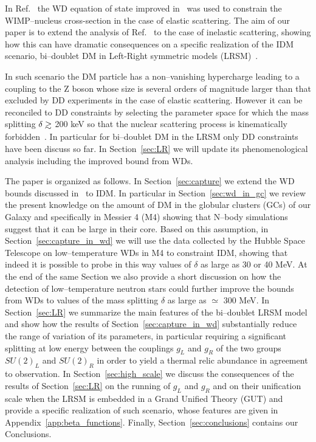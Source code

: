 \documentclass[11pt]{article}
\newcommand{\gsim}{\mathrel{\mathop{\kern 0pt
      \rlap{\raise.2ex\hbox{$>$}}}\lower.9ex\hbox{\kern-.190em $\sim$}}}
\begin{document}
In Ref.~\cite{improved_WD_2021} the WD equation of state improved in~\cite{WD_improved_eos} was used to constrain the WIMP--nucleus cross-section in the case of elastic scattering. The aim of our paper is to extend the analysis of Ref.~\cite{improved_WD_2021} to the case of inelastic scattering, showing how this can have dramatic consequences on a specific realization of the IDM scenario, bi--doublet DM in Left-Right symmetric models (LRSM)~\cite{Garcia-Cely_LR_pheno}.

In such scenario the DM particle
has a non--vanishing hypercharge leading to a coupling to the Z boson whose size is several orders of magnitude larger than that excluded by DD experiments in the case of elastic scattering.
However it can be reconciled to DD constraints by selecting the parameter space for which the mass splitting $\delta\gsim$ 200 keV so that the nuclear scattering process is kinematically forbidden~\cite{path_to_SO10_2019}. In particular for bi--doublet DM  in the LRSM only DD constraints have been discuss so far. In Section~\ref{sec:LR} we will update its phenomenological analysis including the improved bound from WDs.

The paper is organized as follows. In Section~\ref{sec:capture} we extend the WD bounds discussed in~\cite{improved_WD_2021} to IDM. In particular in Section~\ref{sec:wd_in_gc} we review the present knowledge on the amount of DM in the globular clusters (GCs) of our Galaxy and specifically in Messier 4 (M4) showing that N--body simulations suggest that it can be large in their core. Based on this assumption, in Section~\ref{sec:capture_in_wd} we will use the data collected by the Hubble Space Telescope on low--temperature WDs in M4 to constraint IDM, showing that indeed it is possible to probe in this way values of $\delta$ as large as 30 or 40 MeV. At the end of the same Section we also provide a short discussion on how the detection of low--temperature neutron stars could further improve the bounds from WDs to values of the mass splitting $\delta$ as large as $\simeq$ 300 MeV. In Section~\ref{sec:LR} we summarize the main features of the bi--doublet LRSM model and show how the results of Section~\ref{sec:capture_in_wd} substantially reduce the range of variation of its parameters, in particular requiring a significant splitting at low energy between the couplings $g_L$ and $g_R$ of the two groups $SU(2)_L$ and $SU(2)_R$ in order to yield a thermal relic abundance in agreement to observation. In Section~\ref{sec:high_scale} we discuss the consequences of the results of Section~\ref{sec:LR} on the running of $g_L$ and $g_R$ and on their unification scale when the LRSM is embedded in a Grand Unified Theory (GUT) and provide a specific realization of such scenario, whose features are given in Appendix~\ref{app:beta_functions}.  Finally, Section~\ref{sec:conclusions} contains our Conclusions.
\end{document}

